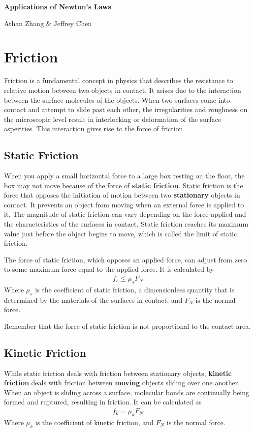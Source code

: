 \documentclass[11pt]{article}
\begin{document}
\textbf{\Huge Applications of Newton's Laws}

Athan Zhang \& Jeffrey Chen

\section{Friction}

Friction is a fundamental concept in physics that describes the resistance to relative motion between two objects in contact. It arises due to the interaction between the surface molecules of the objects. When two surfaces come into contact and attempt to slide past each other, the irregularities and roughness on the microscopic level result in interlocking or deformation of the surface asperities. This interaction gives rise to the force of friction.

\subsection{Static Friction}

When you apply a small horizontal force to a large box resting on the floor, the box may not move because of the force of \textbf{static friction}. Static friction is the force that opposes the initiation of motion between two \textbf{stationary} objects in contact. It prevents an object from moving when an external force is applied to it. The magnitude of static friction can vary depending on the force applied and the characteristics of the surfaces in contact. Static friction reaches its maximum value just before the object begins to move, which is called the limit of static friction.

The force of static friction, which opposes an applied force, can adjust from zero to some maximum force equal to the applied force. It is calculated by
\begin{align*}
    f_{s} \leq \mu_s F_N
\end{align*}
Where $\mu_s$ is the coefficient of static friction, a dimensionless quantity that is determined by the materials of the surfaces in contact, and $F_{N}$ is the normal force. 

Remember that the force of static friction is not proportional to the contact area.

\subsection{Kinetic Friction}

While static friction deals with friction between stationary objects, \textbf{kinetic friction} deals with friction between \textbf{moving} objects sliding over one another. When an object is sliding across a surface, molecular bonds are continually being formed and ruptured, resulting in friction. It can be calculated as
\begin{align*}
    f_k = \mu_k F_N
\end{align*}
Where $\mu_k$ is the coefficient of kinetic friction, and $F_N$ is the normal force.
\end{document}
